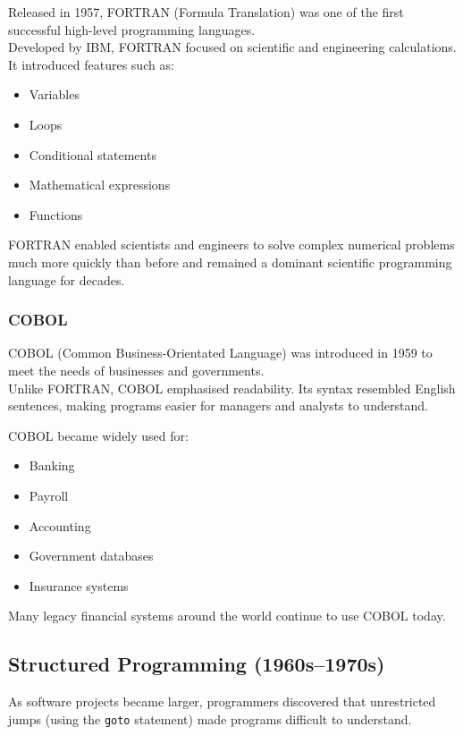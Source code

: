 Released in 1957, FORTRAN (Formula Translation) was one of the first successful high-level programming languages.\\

Developed by IBM, FORTRAN focused on scientific and engineering calculations. It introduced features such as:

\begin{itemize}
    \item Variables
    \item Loops
    \item Conditional statements
    \item Mathematical expressions
    \item Functions
\end{itemize}

FORTRAN enabled scientists and engineers to solve complex numerical problems much more quickly than before and remained a dominant scientific programming language for decades.

\subsubsection{COBOL}

COBOL (Common Business-Orientated Language) was introduced in 1959 to meet the needs of businesses and governments.\\

Unlike FORTRAN, COBOL emphasised readability. Its syntax resembled English sentences, making programs easier for managers and analysts to understand.

COBOL became widely used for:

\begin{itemize}
    \item Banking
    \item Payroll
    \item Accounting
    \item Government databases
    \item Insurance systems
\end{itemize}

Many legacy financial systems around the world continue to use COBOL today.

\subsection{Structured Programming (1960s--1970s)}

As software projects became larger, programmers discovered that unrestricted jumps (using the \texttt{goto} statement) made programs difficult to understand.\\

